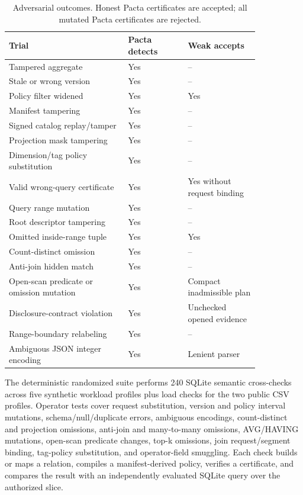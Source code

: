 \documentclass[conference]{IEEEtran}
\newcommand{\sys}{Pacta\xspace}
\begin{document}
\begin{table}[t]
\centering
\caption{Adversarial outcomes. Honest \sys certificates are accepted; all mutated \sys certificates are rejected.}
\label{tab:detection}
\scriptsize
\begin{tabular}{p{0.40\linewidth}p{0.20\linewidth}p{0.24\linewidth}}
\toprule
Trial & \sys detects & Weak accepts \\
\midrule
Tampered aggregate & Yes & -- \\
Stale or wrong version & Yes & -- \\
Policy filter widened & Yes & Yes \\
Manifest tampering & Yes & -- \\
Signed catalog replay/tamper & Yes & -- \\
Projection mask tampering & Yes & -- \\
Dimension/tag policy substitution & Yes & -- \\
Valid wrong-query certificate & Yes & Yes without request binding \\
Query range mutation & Yes & -- \\
Root descriptor tampering & Yes & -- \\
Omitted inside-range tuple & Yes & Yes \\
Count-distinct omission & Yes & -- \\
Anti-join hidden match & Yes & -- \\
Open-scan predicate or omission mutation & Yes & Compact inadmissible plan \\
Disclosure-contract violation & Yes & Unchecked opened evidence \\
Range-boundary relabeling & Yes & -- \\
Ambiguous JSON integer encoding & Yes & Lenient parser \\
\bottomrule
\end{tabular}
\end{table}

The deterministic randomized suite performs 240 SQLite semantic cross-checks across five synthetic workload profiles plus load checks for the two public CSV profiles. Operator tests cover request substitution, version and policy interval mutations, schema/null/duplicate errors, ambiguous encodings, count-distinct and projection omissions, anti-join and many-to-many omissions, AVG/HAVING mutations, open-scan predicate changes, top-k omissions, join request/segment binding, tag-policy substitution, and operator-field smuggling. Each check builds or maps a relation, compiles a manifest-derived policy, verifies a certificate, and compares the result with an independently evaluated SQLite query over the authorized slice.
\end{document}
